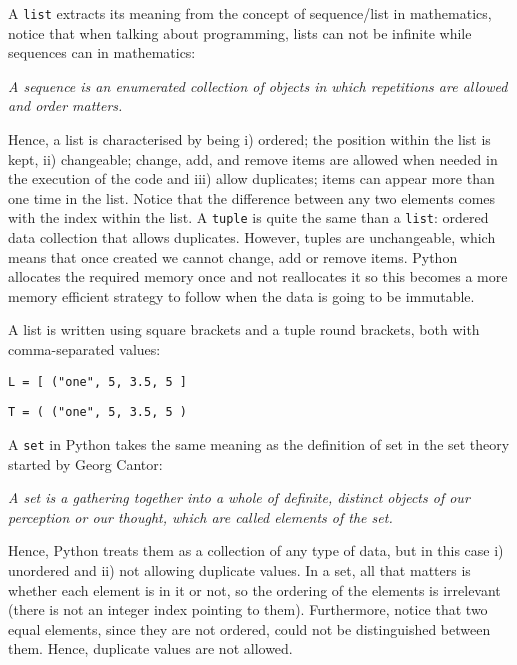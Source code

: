 A \texttt{list} extracts its meaning from the concept of sequence/list in mathematics, notice that when talking about programming, lists can not be infinite while sequences can in mathematics:

\textit{A sequence is an enumerated collection of objects in which repetitions are allowed and order matters.}

Hence, a list is characterised by being i) ordered; the position within the list is kept, ii) changeable; change, add, and remove items are allowed when needed in the execution of the code and iii) allow duplicates; items can appear more than one time in the list. Notice that the difference between any two elements comes with the index within the list.
A \texttt{tuple} is quite the same than a \texttt{list}: ordered data collection that allows duplicates. 
However, tuples are unchangeable, which means that once created we cannot change, add or remove items. 
Python allocates the required memory once and not reallocates it so this becomes a more memory efficient strategy to follow when the data is going to be immutable.

A list is written using square brackets and a tuple round brackets, both with comma-separated values:
\begin{verbatim}
L = [ ("one", 5, 3.5, 5 ]
\end{verbatim}
\begin{verbatim}
T = ( ("one", 5, 3.5, 5 )
\end{verbatim}

A \texttt{set} in Python takes the same meaning as the definition of set in the set theory started by Georg Cantor:

\textit{A set is a gathering together into a whole of definite, distinct objects of our perception or our thought, which are called elements of the set.}

Hence, Python treats them as a collection of any type of data, but in this case i) unordered and ii) not allowing duplicate values. 
In a set, all that matters is whether each element is in it or not, so the ordering of the elements is irrelevant (there is not an integer index pointing to them).
Furthermore, notice that two equal elements, since they are not ordered, could not be distinguished between them. Hence, duplicate values are not allowed. 

